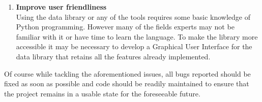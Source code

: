 \begin{enumerate}
    \item \textbf{Improve user friendliness}\\
    Using the data library or any of the tools requires some basic knowledge of Python programming. However many of the fields experts may not be familiar with it or have time to learn the language. To make the library more accessible it may be necessary to develop a Graphical User Interface for the data library that retains all the features already implemented.
    
\end{enumerate}
Of course while tackling the aforementioned issues, all bugs reported should be fixed as soon as possible and code should be readily maintained to ensure that the project remains in a usable state for the foreseeable future.